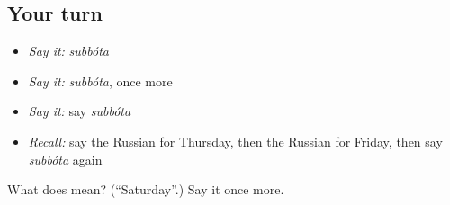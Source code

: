 \subsection*{Your turn}
\begin{itemize}
\raggedright
  \item \emph{Say it:} \emph{subbóta}
  \item \emph{Say it:} \emph{subbóta}, once more
  \item \emph{Say it:} say \emph{subbóta}
  \item \emph{Recall:} say the Russian for Thursday, then the Russian for Friday, then say \emph{subbóta} again
\end{itemize}

\begin{tcolorbox}[breakable,colback=teal!4,colframe=teal!35!black,title={Before you move on}]
What does  mean? (\textquotedblleft{}Saturday\textquotedblright{}.) Say it once more.
\end{tcolorbox}
